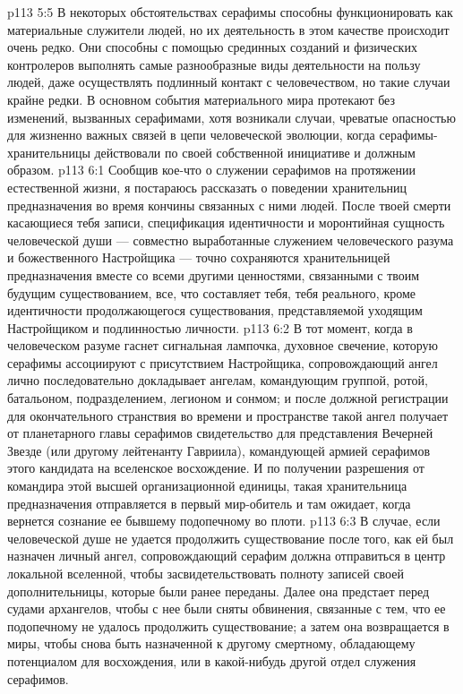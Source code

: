 \vs p113 5:5 \pc В некоторых обстоятельствах серафимы способны функционировать как материальные служители людей, но их деятельность в этом качестве происходит очень редко. Они способны с помощью срединных созданий и физических контролеров выполнять самые разнообразные виды деятельности на пользу людей, даже осуществлять подлинный контакт с человечеством, но такие случаи крайне редки. В основном события материального мира протекают без изменений, вызванных серафимами, хотя возникали случаи, чреватые опасностью для жизненно важных связей в цепи человеческой эволюции, когда серафимы\hyp{}хранительницы действовали по своей собственной инициативе и должным образом.
\vs p113 6:1 Сообщив кое\hyp{}что о служении серафимов на протяжении естественной жизни, я постараюсь рассказать о поведении хранительниц предназначения во время кончины связанных с ними людей. После твоей смерти касающиеся тебя записи, спецификация идентичности и моронтийная сущность человеческой души --- совместно выработанные служением человеческого разума и божественного Настройщика --- точно сохраняются хранительницей предназначения вместе со всеми другими ценностями, связанными с твоим будущим существованием, все, что составляет тебя, тебя реального, кроме идентичности продолжающегося существования, представляемой уходящим Настройщиком и подлинностью личности.
\vs p113 6:2 В тот момент, когда в человеческом разуме гаснет сигнальная лампочка, духовное свечение, которую серафимы ассоциируют с присутствием Настройщика, сопровождающий ангел лично последовательно докладывает ангелам, командующим группой, ротой, батальоном, подразделением, легионом и сонмом; и после должной регистрации для окончательного странствия во времени и пространстве такой ангел получает от планетарного главы серафимов свидетельство для представления Вечерней Звезде (или другому лейтенанту Гавриила), командующей армией серафимов этого кандидата на вселенское восхождение. И по получении разрешения от командира этой высшей организационной единицы, такая хранительница предназначения отправляется в первый мир\hyp{}обитель и там ожидает, когда вернется сознание ее бывшему подопечному во плоти.
\vs p113 6:3 \pc В случае, если человеческой душе не удается продолжить существование после того, как ей был назначен личный ангел, сопровождающий серафим должна отправиться в центр локальной вселенной, чтобы засвидетельствовать полноту записей своей дополнительницы, которые были ранее переданы. Далее она предстает перед судами архангелов, чтобы с нее были сняты обвинения, связанные с тем, что ее подопечному не удалось продолжить существование; а затем она возвращается в миры, чтобы снова быть назначенной к другому смертному, обладающему потенциалом для восхождения, или в какой\hyp{}нибудь другой отдел служения серафимов.
